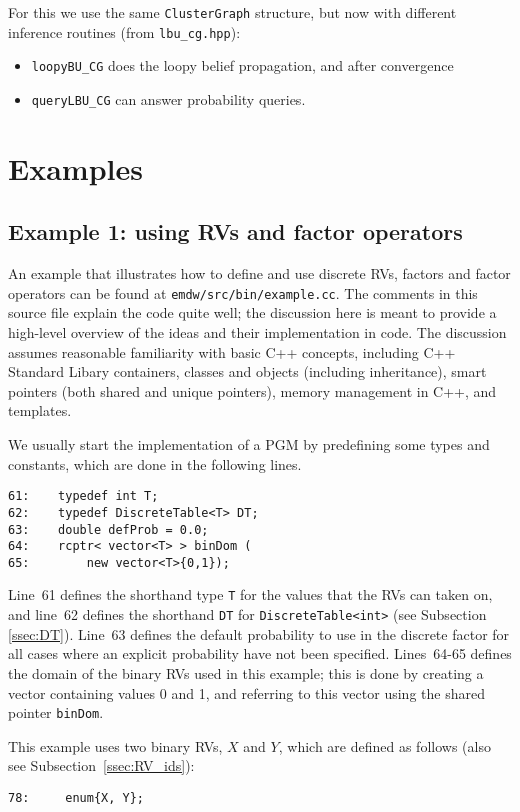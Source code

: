 \documentclass[english]{article}
\begin{document}
For this we use the same \texttt{ClusterGraph} structure, but now with
different inference routines (from \texttt{lbu\_cg.hpp}):
\begin{itemize}
\item \texttt{loopyBU\_CG} does the loopy belief propagation, and
  after convergence
\item \texttt{queryLBU\_CG} can answer probability queries.
\end{itemize}

\section{Examples} \label{sec:examples}

\subsection{Example 1: using RVs and factor operators}
An example that illustrates how to define and use discrete RVs,
factors and factor operators can be found at
\texttt{emdw/src/bin/example.cc}.  The comments in this source file
explain the code quite well; the discussion here is meant to provide a
high-level overview of the ideas and their implementation in code.
The discussion assumes reasonable familiarity with basic C++ concepts,
including C++ Standard Libary containers, classes and objects
(including inheritance), smart pointers (both shared and unique
pointers), memory management in C++, and templates.

We usually start the implementation of a PGM by predefining some types
and constants, which are done in the following lines.
\begin{verbatim}
61:    typedef int T;
62:    typedef DiscreteTable<T> DT;
63:    double defProb = 0.0;
64:    rcptr< vector<T> > binDom (
65:        new vector<T>{0,1});
\end{verbatim}
Line~61 defines the shorthand type \texttt{T} for the values that the
RVs can taken on, and line~62 defines the shorthand \texttt{DT} for
\texttt{DiscreteTable<int>} (see Subsection \ref{ssec:DT}).  Line~63
defines the default probability to use in the discrete factor for all
cases where an explicit probability have not been specified.
Lines~64-65 defines the domain of the binary RVs used in this example;
this is done by creating a vector containing values 0 and 1, and
referring to this vector using the shared pointer \texttt{binDom}.

This example uses two binary RVs, $X$ and $Y$, which are defined as
follows (also see Subsection~\ref{ssec:RV_ids}):
\begin{verbatim}
78:     enum{X, Y};
\end{verbatim}
\end{document}

